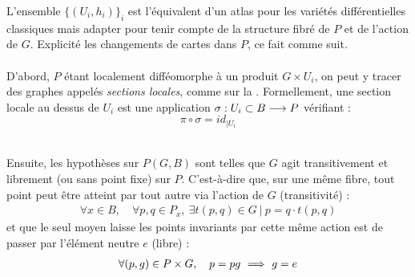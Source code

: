 L'ensemble $\big\{(U_i, h_i)\big\}_i$ est l'équivalent d'un atlas pour les variétés différentielles classiques mais adapter pour tenir compte de la structure fibré de $P$ et de l'action de $G$. Explicité les changements de cartes dans $P$, ce fait comme suit.
\\ 
\\
D'abord, $P$ étant localement difféomorphe à un produit $G\times U_i$, on peut y tracer des graphes appelés \emph{sections locales}, comme sur la  . Formellement, une section locale au dessus  de $U_i$ est une application $\sigma : U_i\subset B\longrightarrow P$ vérifiant :
\[\pi\circ \sigma = id_{{\displaystyle |}U_i}\]
\\
\begin{figure}[h]
	\begin{floatrow}
	
\end{floatrow}
\end{figure}
\noindent
Ensuite, les hypothèses sur $P(G,B)$ sont telles que $G$ agit transitivement et librement (ou sans point fixe) sur $P$. C'est-à-dire que, sur une même fibre, tout point peut être atteint par tout autre via l'action de $G$ (transitivité) :
\begin{align*}
	\forall x\in B,\quad \forall p,q\in P_x,\ \exists t(p,q)\in G\ |\ p = q\cdot t(p,q) 
\end{align*}
et que le seul moyen laisse les points invariants par cette même action est de passer par l'élément neutre $e$ (libre) :
\begin{align*}
	\forall (p,g)\in P\times G,\quad p = pg\ \Longrightarrow\ g=e
\end{align*}
